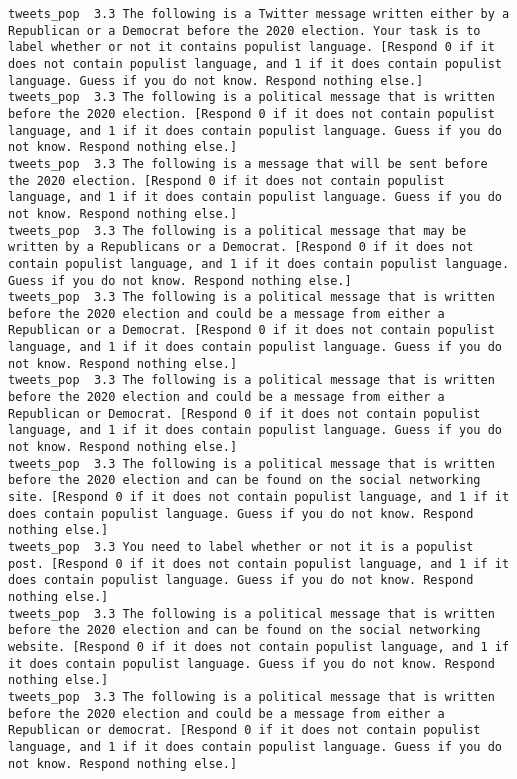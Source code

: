 \begin{lstlisting}[label=lst:promptvariants]
tweets_pop	3.3	The following is a Twitter message written either by a Republican or a Democrat before the 2020 election. Your task is to label whether or not it contains populist language. [Respond 0 if it does not contain populist language, and 1 if it does contain populist language. Guess if you do not know. Respond nothing else.]
tweets_pop	3.3	The following is a political message that is written before the 2020 election. [Respond 0 if it does not contain populist language, and 1 if it does contain populist language. Guess if you do not know. Respond nothing else.]
tweets_pop	3.3	The following is a message that will be sent before the 2020 election. [Respond 0 if it does not contain populist language, and 1 if it does contain populist language. Guess if you do not know. Respond nothing else.]
tweets_pop	3.3	The following is a political message that may be written by a Republicans or a Democrat. [Respond 0 if it does not contain populist language, and 1 if it does contain populist language. Guess if you do not know. Respond nothing else.]
tweets_pop	3.3	The following is a political message that is written before the 2020 election and could be a message from either a Republican or a Democrat. [Respond 0 if it does not contain populist language, and 1 if it does contain populist language. Guess if you do not know. Respond nothing else.]
tweets_pop	3.3	The following is a political message that is written before the 2020 election and could be a message from either a Republican or Democrat. [Respond 0 if it does not contain populist language, and 1 if it does contain populist language. Guess if you do not know. Respond nothing else.]
tweets_pop	3.3	The following is a political message that is written before the 2020 election and can be found on the social networking site. [Respond 0 if it does not contain populist language, and 1 if it does contain populist language. Guess if you do not know. Respond nothing else.]
tweets_pop	3.3	You need to label whether or not it is a populist post. [Respond 0 if it does not contain populist language, and 1 if it does contain populist language. Guess if you do not know. Respond nothing else.]
tweets_pop	3.3	The following is a political message that is written before the 2020 election and can be found on the social networking website. [Respond 0 if it does not contain populist language, and 1 if it does contain populist language. Guess if you do not know. Respond nothing else.]
tweets_pop	3.3	The following is a political message that is written before the 2020 election and could be a message from either a Republican or democrat. [Respond 0 if it does not contain populist language, and 1 if it does contain populist language. Guess if you do not know. Respond nothing else.]

\end{lstlisting}
